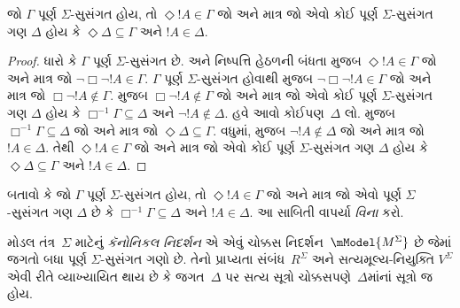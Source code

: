 %

\begin{prop}
  જો $\Gamma$ પૂર્ણ $\Sigma$-સુસંગત હોય, તો $\Diamond !A \in
  \Gamma$ જો અને માત્ર જો એવો કોઈ પૂર્ણ $\Sigma$-સુસંગત ગણ
  $\Delta$ હોય કે $\Diamond\Delta \subseteq \Gamma$ અને
  $!A \in \Delta$.
\end{prop}

\begin{proof}
ધારો કે $\Gamma$ પૂર્ણ $\Sigma$-સુસંગત છે. \Dual{} અને નિષ્પત્તિ
હેઠળની બંધતા મુજબ $\Diamond!A \in \Gamma$ જો અને માત્ર જો
$\lnot\Box\lnot !A \in \Gamma$. $\Gamma$ પૂર્ણ
$\Sigma$-સુસંગત હોવાથી
 મુજબ
$\lnot\Box\lnot !A \in \Gamma$ જો અને માત્ર જો
$\Box\lnot !A \notin \Gamma$.  મુજબ
$\Box\lnot !A \notin \Gamma$ જો અને માત્ર જો એવો કોઈ પૂર્ણ
$\Sigma$-સુસંગત ગણ $\Delta$ હોય કે $\Box^{-1}\Gamma
\subseteq \Delta$ અને $\lnot!A \notin \Delta$. હવે આવો
કોઈપણ~$\Delta$ લો.  મુજબ
$\Box^{-1}\Gamma \subseteq \Delta$ જો અને માત્ર જો
$\Diamond\Delta \subseteq \Gamma$. વધુમાં,
 મુજબ
$\lnot !A \notin \Delta$ જો અને માત્ર જો $!A \in \Delta$.
તેથી $\Diamond!A \in \Gamma$ જો અને માત્ર જો એવો કોઈ પૂર્ણ
$\Sigma$-સુસંગત ગણ $\Delta$ હોય કે $\Diamond\Delta
\subseteq \Gamma$ અને $!A \in \Delta$.
\end{proof}



\begin{prob}
  બતાવો કે જો $\Gamma$ પૂર્ણ $\Sigma$-સુસંગત હોય, તો
  $\Diamond !A \in \Gamma$ જો અને માત્ર જો એવો પૂર્ણ
    $\Sigma$-સુસંગત ગણ $\Delta$ છે કે $\Box^{-1}\Gamma
    \subseteq \Delta$ અને $!A \in \Delta$. આ સાબિતી
   વાપર્યા \emph{વિના} કરો.
\end{prob}
\endgroup

\begingroup
\makeatletter{}\makeatother


\label{guunit:OLP-0446}


મોડલ તંત્ર~$\Sigma$ માટેનું \emph{કૅનોનિકલ નિદર્શન} એ એવું ચોક્કસ
નિદર્શન~$\mModel{M^\Sigma}$ છે જેમાં જગતો બધા પૂર્ણ
$\Sigma$-સુસંગત ગણો છે. તેનો પ્રાપ્યતા સંબંધ~$R^\Sigma$ અને
સત્યમૂલ્ય-નિયુક્તિ $V^\Sigma$ એવી રીતે વ્યાખ્યાયિત થાય છે કે
જગત~$\Delta$ પર સત્ય સૂત્રો ચોક્કસપણે~$\Delta$માંનાં
સૂત્રો જ હોય.

